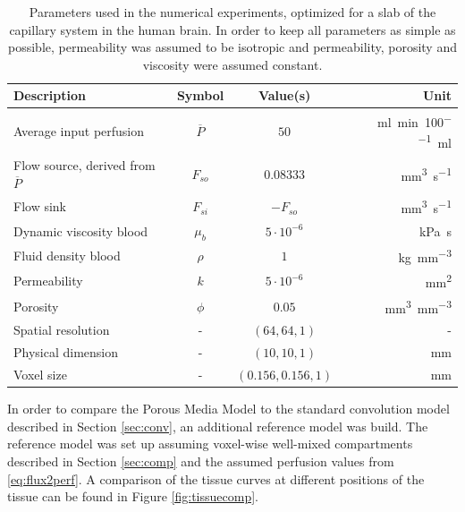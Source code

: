 \documentclass[paper=a4, fontsize=11pt,parskip=half,headings=small]{scrartcl}
\newcommand{\siqt}{\cubic\milli\meter\per\second}
\newcommand{\sirho}{\kilo\gram\per\cubic\milli\meter}
\newcommand{\siPn}{\milli\litre\per\minute\per100\milli\litre}
\begin{document}
	\begin{table}[H]
		\centering
	  \caption{Parameters used in the numerical experiments, optimized for a slab of the capillary system in the human brain. In order to keep all parameters as simple as possible, permeability was assumed to be isotropic and permeability, porosity and viscosity were assumed constant.}		
		\begin{tabular}{ l  c  c  r }
		    Description 									& Symbol 			& Value(s) 				& Unit 				\\
			\toprule
		    Average input perfusion 				 		& $\overline{P}$ 	& $50$ 					& \si{\siPn}		\\
			Flow source, derived from $\overline{P}$ 		& $F_{so}$ 			& $0.08333$ 			& \si{\siqt}  		\\
			Flow sink 										& $F_{si}$ 			& $-F_{so}$ 		 	& \si{\siqt}  		\\
			Dynamic viscosity blood \cite{rosencranz06} 	& $\mu_b$ 			& $5 \cdot 10^{-6}$ 	& \si{\kilo\pascal\second}  	\\
			Fluid density blood \cite{kenner89} 			& $\rho$ 			& $1 $ 					& \si{\sirho} 		\\		
			Permeability  									& $k$ 				& $5 \cdot 10^{-6}$ 	& \si{\square\milli\meter} 			\\	
			Porosity\cite{wu03}								& $\phi$ 			& $0.05$ 				& \si{\cubic\milli\meter\per\cubic\milli\meter	}	\\	
			Spatial resolution 								& - 				& $(64,64,1)$ 			& -					\\
			Physical dimension 								& - 				& $(10,10,1)$ 			& \si{\milli\meter}				\\
			Voxel size 										& - 				& $(0.156,0.156,1)$ 	& \si{\milli\meter}	\\
	  \end{tabular}
	  \label{tab:par}
	\end{table}	
	
	In order to compare the Porous Media Model to the standard convolution model described in Section \ref{sec:conv}, an additional reference model was build.
	The reference model was set up assuming voxel-wise well-mixed compartments described in Section \ref{sec:comp} and the assumed perfusion values from \eqref{eq:flux2perf}.
	A comparison of the tissue curves at different positions of the tissue can be found in Figure \ref{fig:tissuecomp}. 
\end{document}
